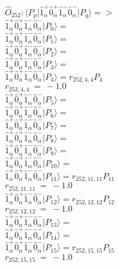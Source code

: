 \documentclass[14pt]{article}
\begin{document}
    $\hat{O}_{252}:  \langle{P_p}\vert \hat{1}_{\alpha}^{+}\hat{0}_{\alpha}^{+}\hat{1}_{\alpha}^{-}\hat{0}_{\alpha}^{-} \vert{P_q}\rangle => $ \\ 
    $ \hat{1}_{\alpha}^{+}\hat{0}_{\alpha}^{+}\hat{1}_{\alpha}^{-}\hat{0}_{\alpha}^{-} \vert{P_{0}}\rangle =  $ \\ 
    $ \hat{1}_{\alpha}^{+}\hat{0}_{\alpha}^{+}\hat{1}_{\alpha}^{-}\hat{0}_{\alpha}^{-} \vert{P_{1}}\rangle =  $ \\ 
    $ \hat{1}_{\alpha}^{+}\hat{0}_{\alpha}^{+}\hat{1}_{\alpha}^{-}\hat{0}_{\alpha}^{-} \vert{P_{2}}\rangle =  $ \\ 
    $ \hat{1}_{\alpha}^{+}\hat{0}_{\alpha}^{+}\hat{1}_{\alpha}^{-}\hat{0}_{\alpha}^{-} \vert{P_{3}}\rangle =  $ \\ 
    $ \hat{1}_{\alpha}^{+}\hat{0}_{\alpha}^{+}\hat{1}_{\alpha}^{-}\hat{0}_{\alpha}^{-} \vert{P_{4}}\rangle = {r}_{252,4,4}P_{4} $ \\ 
    ${r}_{252,4,4}\ =\ -1.0 $ \\ 
    $ \hat{1}_{\alpha}^{+}\hat{0}_{\alpha}^{+}\hat{1}_{\alpha}^{-}\hat{0}_{\alpha}^{-} \vert{P_{5}}\rangle =  $ \\ 
    $ \hat{1}_{\alpha}^{+}\hat{0}_{\alpha}^{+}\hat{1}_{\alpha}^{-}\hat{0}_{\alpha}^{-} \vert{P_{6}}\rangle =  $ \\ 
    $ \hat{1}_{\alpha}^{+}\hat{0}_{\alpha}^{+}\hat{1}_{\alpha}^{-}\hat{0}_{\alpha}^{-} \vert{P_{7}}\rangle =  $ \\ 
    $ \hat{1}_{\alpha}^{+}\hat{0}_{\alpha}^{+}\hat{1}_{\alpha}^{-}\hat{0}_{\alpha}^{-} \vert{P_{8}}\rangle =  $ \\ 
    $ \hat{1}_{\alpha}^{+}\hat{0}_{\alpha}^{+}\hat{1}_{\alpha}^{-}\hat{0}_{\alpha}^{-} \vert{P_{9}}\rangle =  $ \\ 
    $ \hat{1}_{\alpha}^{+}\hat{0}_{\alpha}^{+}\hat{1}_{\alpha}^{-}\hat{0}_{\alpha}^{-} \vert{P_{10}}\rangle =  $ \\ 
    $ \hat{1}_{\alpha}^{+}\hat{0}_{\alpha}^{+}\hat{1}_{\alpha}^{-}\hat{0}_{\alpha}^{-} \vert{P_{11}}\rangle = {r}_{252,11,11}P_{11} $ \\ 
    ${r}_{252,11,11}\ =\ -1.0 $ \\ 
    $ \hat{1}_{\alpha}^{+}\hat{0}_{\alpha}^{+}\hat{1}_{\alpha}^{-}\hat{0}_{\alpha}^{-} \vert{P_{12}}\rangle = {r}_{252,12,12}P_{12} $ \\ 
    ${r}_{252,12,12}\ =\ -1.0 $ \\ 
    $ \hat{1}_{\alpha}^{+}\hat{0}_{\alpha}^{+}\hat{1}_{\alpha}^{-}\hat{0}_{\alpha}^{-} \vert{P_{13}}\rangle =  $ \\ 
    $ \hat{1}_{\alpha}^{+}\hat{0}_{\alpha}^{+}\hat{1}_{\alpha}^{-}\hat{0}_{\alpha}^{-} \vert{P_{14}}\rangle =  $ \\ 
    $ \hat{1}_{\alpha}^{+}\hat{0}_{\alpha}^{+}\hat{1}_{\alpha}^{-}\hat{0}_{\alpha}^{-} \vert{P_{15}}\rangle = {r}_{252,15,15}P_{15} $ \\ 
    ${r}_{252,15,15}\ =\ -1.0 $ \\ 
    
\end{document}
